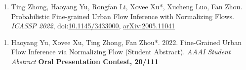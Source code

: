 

\begin{enumerate}[resume]
    \item Ting Zhong, Haoyang Yu, Rongfan Li, Xovee Xu*, Xucheng Luo, Fan Zhou. Probabilistic Fine-grained Urban Flow Inference with Normalizing Flows. \textit{ICASSP 2022}, doi:\href{papers/ICASSP_2022_FUFI.pdf}{10.1145/3433000}, \href{https://arxiv.org/abs/2005.11041}{arXiv:2005.11041}
\end{enumerate}


\begin{enumerate}[resume]
    \item Haoyang Yu, Xovee Xu, Ting Zhong, Fan Zhou*. 2022. Fine-Grained Urban Flow Inference via Normalizing Flow (Student Abstract). \textit{AAAI Student Abstract}
    \newline \textbf{\color{red}Oral Presentation Contest, 20/111}
\end{enumerate}